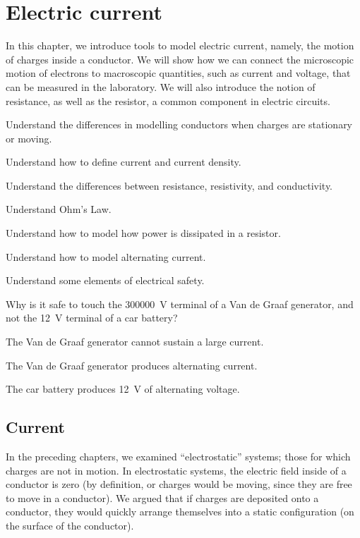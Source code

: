 \chapter{Electric current}
\label{chapter:current}
In this chapter, we introduce tools to model electric current, namely, the motion of charges inside a conductor. We will show how we can connect the microscopic motion of electrons to macroscopic quantities, such as current and voltage, that can be measured in the laboratory. We will also introduce the notion of resistance, as well as the resistor, a common component in electric circuits. 
\begin{learningObjectives}{
 \item Understand the differences in modelling conductors when charges are stationary or moving.
 \item Understand how to define current and current density.
 \item Understand the differences between resistance, resistivity, and conductivity.
 \item Understand Ohm's Law.
 \item Understand how to model how power is dissipated in a resistor.
 \item Understand how to model alternating current.
 \item Understand some elements of electrical safety.
 }
\end{learningObjectives}

\begin{opening}
\begin{MCquestion}{Why is it safe to touch the \SI{300000}{V} terminal of a Van de Graaf generator, and not the \SI{12}{V} terminal of a car battery?}
\item The Van de Graaf generator cannot sustain a large current. \correct
\item The Van de Graaf generator produces alternating current.
\item The car battery produces \SI{12}{V} of alternating voltage.
\end{MCquestion}
\end{opening}

\section{Current}
In the preceding chapters, we examined ``electrostatic'' systems; those for which charges are not in motion. In electrostatic systems, the electric field inside of a conductor is zero (by definition, or charges would be moving, since they are free to move in a conductor). We argued that if charges are deposited onto a conductor, they would quickly arrange themselves into a static configuration (on the surface of the conductor). 

